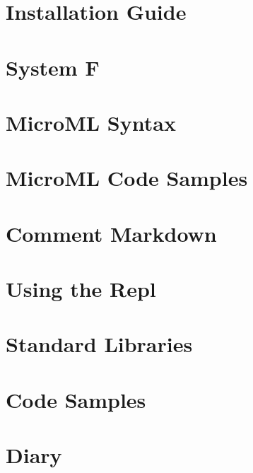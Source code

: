 \documentclass[12pt, a4paper]{report}
\begin{document}
\begin{appendices}
    \chapter{Installation Guide}
    
    \chapter{System F}
    \label{appendix:sysf}
    
    \chapter{MicroML Syntax}
    \label{appendix:syntax}
    
    \chapter{MicroML Code Samples}
    \label{appendix:mmlcode}
    
    \chapter{Comment Markdown}
    \label{appendix:md}
    
    \chapter{Using the Repl}
    \label{appendix:repl}
    
    \chapter{Standard Libraries}
    \label{appendix:libs}
    
    \chapter{Code Samples}
    \label{appendix:samples}
    
    \chapter{Diary}
    \label{appendix:diary}
    
\end{appendices}

\nocite{adams2012layout}
\nocite{9780511608865}
\nocite{Wadler:1995:MFP:647698.734146}
\nocite{958}
\nocite{Steele:1994:BIC:174675.178068}
\nocite{opac-b1081362}
\nocite{cardelli1984basic}

{}

\end{document}
